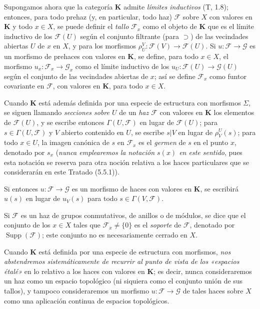 \begin{env}[3.1.6]
\label{0.3.1.6-fr}
Supongamos ahora que la categoría $\boldsymbol{K}$ admite \emph{límites
inductivos} (T, 1.8); entonces, para todo prehaz (y, en particular, todo
haz) $\mathcal{F}$ sobre $X$ con valores en $\boldsymbol{K}$ y todo $x\in X$,
se puede definir el \emph{tallo} $\mathcal{F}_x$ como el objeto de $\boldsymbol{K}$
que es el límite inductivo de los $\mathcal{F}(U)$ según el conjunto filtrante (para
$\supset$) de las vecindades abiertas $U$ de $x$ en $X$, y para los morfismos
$\rho_U^V:\mathcal{F}(V)\to\mathcal{F}(U)$. Si
$u:\mathcal{F}\to\mathcal{G}$ es un morfismo de prehaces con valores en
$\boldsymbol{K}$, se define, para todo $x\in X$, el morfismo
$u_x:\mathcal{F}_x\to\mathcal{G}_x$ como el límite inductivo de los
$u_U:\mathcal{F}(U)\to\mathcal{G}(U)$ según el conjunto de las vecindades abiertas
de $x$; así se define $\mathcal{F}_x$ como funtor covariante en
$\mathcal{F}$, con valores en $\boldsymbol{K}$, para todo $x\in X$.

Cuando $\boldsymbol{K}$ está además definida por una especie de estructura con
morfismos $\Sigma$, se siguen llamando \emph{secciones sobre $U$} de un
\emph{haz $\mathcal{F}$} con valores en $\boldsymbol{K}$ los elementos de
$\mathcal{F}(U)$, y se escribe entonces $\Gamma(U,\mathcal{F})$ en lugar de
$\mathcal{F}(U)$; para $s\in\Gamma(U,\mathcal{F})$ y $V$ abierto contenido en
$U$, se escribe $s|V$ en lugar de $\rho_V^U(s)$; para todo $x\in U$, la imagen
canónica de $s$ en $\mathcal{F}_x$ es el \emph{germen} de $s$ en el punto $x$,
denotado por $s_x$ (\emph{nunca emplearemos la notación $s(x)$ en este sentido},
pues esta notación se reserva para otra noción relativa a los haces
particulares que se considerarán en este Tratado (5.5.1)).

Si entonces $u:\mathcal{F}\to\mathcal{G}$ es un morfismo de haces con valores
en $\boldsymbol{K}$, se escribirá $u(s)$ en lugar de $u_V(s)$ para todo
$s\in\Gamma(V,\mathcal{F})$.

Si $\mathcal{F}$ es un haz de grupos conmutativos, de anillos o de
módulos, se dice que el conjunto de los $x\in X$ tales que
$\mathcal{F}_x\neq\{0\}$ es el \emph{soporte} de $\mathcal{F}$, denotado por
$\operatorname{Supp}(\mathcal{F})$; este conjunto no es necesariamente
cerrado en $X$.

Cuando $\boldsymbol{K}$ está definida por una especie de estructura con morfismos,
\emph{nos abstendremos sistemáticamente de recurrir al punto de
vista de los «espacios étalé»} en lo relativo a los haces con valores en
$\boldsymbol{K}$; es decir, nunca consideraremos un haz como
un espacio topológico (ni siquiera como el conjunto unión de sus tallos), y
tampoco consideraremos un morfismo
$u:\mathcal{F}\to\mathcal{G}$ de tales haces sobre $X$ como una aplicación
continua de espacios topológicos.
\end{env}
